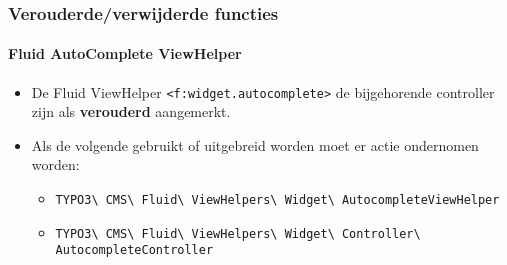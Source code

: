 \begin{frame}[fragile]
	\frametitle{Verouderde/verwijderde functies}
	\framesubtitle{Fluid AutoComplete ViewHelper}

	\begin{itemize}
		\item De Fluid ViewHelper \texttt{<f:widget.autocomplete>} de bijgehorende controller
			zijn als \textbf{verouderd} aangemerkt.
		\item Als de volgende gebruikt of uitgebreid worden moet er actie ondernomen worden:

			\begin{itemize}\smaller
				\item \texttt{TYPO3\textbackslash
					CMS\textbackslash
					Fluid\textbackslash
					ViewHelpers\textbackslash
					Widget\textbackslash
					AutocompleteViewHelper}
				\item \texttt{TYPO3\textbackslash
					CMS\textbackslash
					Fluid\textbackslash
					ViewHelpers\textbackslash
					Widget\textbackslash
					Controller\textbackslash
					AutocompleteController}
			\end{itemize}

	\end{itemize}

\end{frame}


